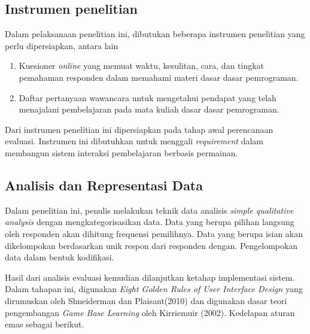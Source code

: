 	\subsection{Instrumen penelitian}
	
	Dalam pelaksanaan penelitian ini, dibutukan beberapa instrumen penelitian yang perlu dipersiapkan, antara lain
	
	\begin{enumerate}
		\item Kuesioner \textit{online} yang memuat waktu, kesulitan, cara, dan tingkat pemahaman responden dalam memahami materi dasar dasar pemrograman.
		\item Daftar pertanyaan wawancara untuk mengetahui pendapat yang telah menajalani pembelajaran pada mata kuliah dasar dasar pemrograman.
	\end{enumerate}

	Dari instrumen penelitian ini dipersiapkan pada tahap awal perencanaan evaluasi. Instrumen ini dibutuhkan untuk menggali \textit{requirement} dalam membangun sistem interaksi pembelajaran berbasis permainan.
	
	\subsection{Analisis dan Representasi Data}
	
	Dalam penelitian ini, penulis melakukan teknik data analisis \textit{simple qualitative analysis} dengan mengkategorisasikan data. Data yang berupa pilihan langsung oleh responden akan dihitung frequensi pemilihnya. Data yang berupa isian akan dikelompokan berdasarkan unik respon dari responden dengan. Pengelompokan data dalam bentuk kodifikasi.
	\begin{table}
	\end{table}
	Hasil dari analisis evaluasi kemudian dilanjutkan ketahap implementasi sistem. Dalam tahapan ini, digunakan \textit{Eight Golden Rules of User Interface Design} yang dirumuskan oleh Shneiderman dan Plaisant(2010) dan digunakan dasar teori pengembangan \textit{Game Base Learning} oleh Kirriemuir (2002).
	\linebreak\linebreak
	Kedelapan aturan emas sebagai berikut.
	
